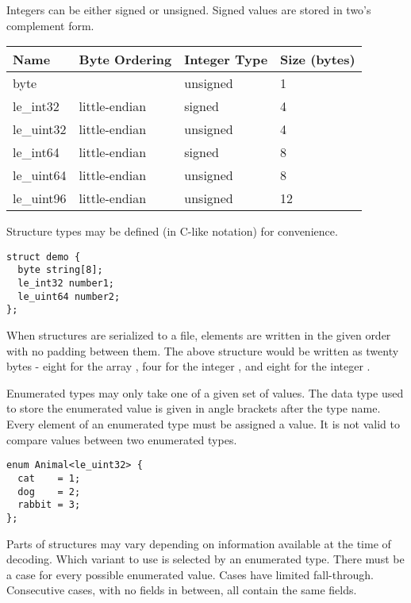 Integers can be either signed or unsigned.
%
Signed values are stored in two's complement form.

\begin{center}
\begin{tabular}{l l l l}
\hline
\textbf{Name} & \textbf{Byte Ordering} & \textbf{Integer Type} & \textbf{Size (bytes)} \\
\hline
byte & & unsigned & 1 \\
le\_int32 & little-endian & signed & 4 \\
le\_uint32 & little-endian & unsigned & 4 \\
le\_int64 & little-endian & signed & 8 \\
le\_uint64 & little-endian & unsigned & 8 \\
le\_uint96 & little-endian & unsigned & 12 \\
\end{tabular}
\end{center}

Structure types may be defined (in C-like notation) for convenience.

\begin{verbatim}
struct demo {
  byte string[8];
  le_int32 number1;
  le_uint64 number2;
};
\end{verbatim}

When structures are serialized to a file, elements are written in the given order with no padding between them.
%
The above structure would be written as twenty bytes - eight for the array , four for the integer , and eight for the integer .

Enumerated types may only take one of a given set of values.
%
The data type used to store the enumerated value is given in angle brackets after the type name.
%
Every element of an enumerated type must be assigned a value.
%
It is not valid to compare values between two enumerated types.

\begin{verbatim}
enum Animal<le_uint32> {
  cat    = 1;
  dog    = 2;
  rabbit = 3;
};
\end{verbatim}

Parts of structures may vary depending on information available at the time of decoding.
%
Which variant to use is selected by an enumerated type.
%
There must be a case for every possible enumerated value.
%
Cases have limited fall-through.
%
Consecutive cases, with no fields in between, all contain the same fields.

